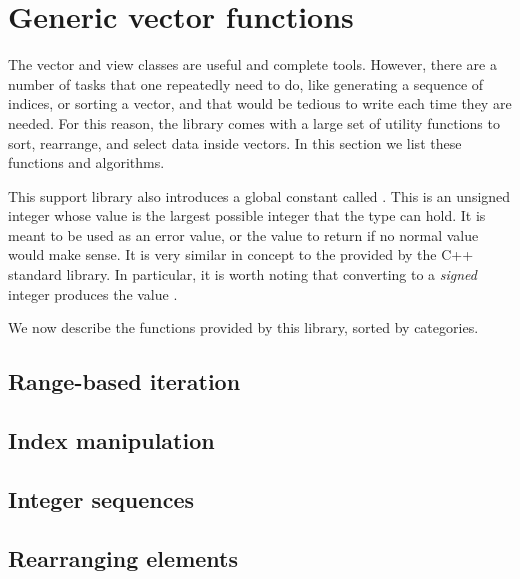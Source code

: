 \section{Generic vector functions \label{SEC:support:generic}}

The vector and view classes are useful and complete tools. However, there are a number of tasks that one repeatedly need to do, like generating a sequence of indices, or sorting a vector, and that would be tedious to write each time they are needed. For this reason, the \phypp library comes with a large set of utility functions to sort, rearrange, and select data inside vectors. In this section we list these functions and algorithms.

This support library also introduces a global constant called . This is an unsigned integer whose value is the largest possible integer that the  type can hold. It is meant to be used as an error value, or the value to return if no normal value would make sense. It is very similar in concept to the  provided by the C++ standard library. In particular, it is worth noting that converting  to a \emph{signed} integer produces the value .

We now describe the functions provided by this library, sorted by categories.

\subsection{Range-based iteration \label{SEC:support:generic:range}}


\subsection{Index manipulation \label{SEC:support:generic:index}}


\subsection{Integer sequences \label{SEC:support:generic:sequence}}


\subsection{Rearranging elements \label{SEC:support:generic:rearrange}}

